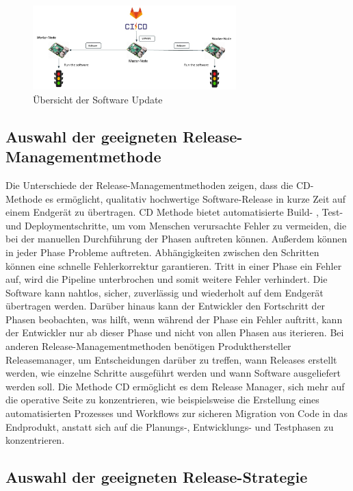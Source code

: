 \begin{figure}[bth] 
	\centering
	\includegraphics[width=0.7\textwidth]{Graphics/architektur.jpeg}
	\caption{Übersicht der Software Update}
	\label{fig:FW-Update-Strategie}
\end{figure}

\subsection{Auswahl der geeigneten Release-Managementmethode}

Die Unterschiede der Release-Managementmethoden zeigen, dass die CD-Methode es ermöglicht, qualitativ hochwertige Software-Release in kurze Zeit auf einem Endgerät zu übertragen. CD Methode bietet automatisierte Build- , Test- und Deploymentschritte, um vom Menschen verursachte Fehler zu vermeiden, die bei der manuellen Durchführung der Phasen auftreten können. Außerdem können in jeder Phase Probleme auftreten. Abhängigkeiten zwischen den Schritten können eine schnelle Fehlerkorrektur garantieren. Tritt in einer Phase ein Fehler auf, wird die Pipeline unterbrochen und somit weitere Fehler verhindert. Die Software kann nahtlos, sicher, zuverlässig und wiederholt auf dem Endgerät übertragen werden. Darüber hinaus kann der Entwickler den Fortschritt der Phasen beobachten, was hilft, wenn während der Phase ein Fehler auftritt, kann der Entwickler nur ab dieser Phase und nicht von allen Phasen aus iterieren. Bei anderen Release-Managementmethoden benötigen Produkthersteller Releasemanager, um Entscheidungen darüber zu treffen, wann Releases erstellt werden, wie einzelne Schritte ausgeführt werden und wann Software ausgeliefert werden soll. Die Methode CD ermöglicht es dem Release Manager, sich mehr auf die operative Seite zu konzentrieren, wie beispielsweise die Erstellung eines automatisierten Prozesses und Workflows zur sicheren Migration von Code in das Endprodukt, anstatt sich auf die Planungs-, Entwicklungs- und Testphasen zu konzentrieren.



\subsection{Auswahl der geeigneten Release-Strategie}

